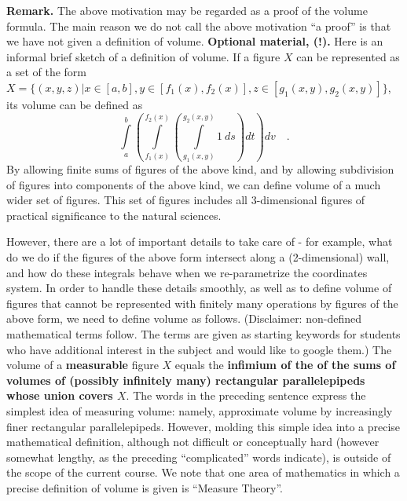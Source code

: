 \documentclass[12pt]{book}
\renewcommand{\emph}{\textbf}
\begin{document}
\begin{itemize}
\textbf{Remark.} The above motivation may be regarded as a proof of the volume formula. The main reason we do not call the above motivation ``a proof'' is that we have not given a definition of volume. \textbf{Optional material, (!).} Here is an informal brief sketch  of a definition of volume. If a figure $X$ can be represented as a set of the form $X= \{(x,y,z)| x\in [a,b], y\in [f_1(x), f_2(x)], z\in [g_1(x,y),  g_2(x,y)]\}$, its volume can be defined as 
\[
\int\limits_a^b \left(\int\limits_{f_1(x)}^{f_2(x)}\left(\int\limits_{g_1(x,y)}^{g_2(x,y)} 1 ~ ds \right)dt \right)dv \quad .
\]
By allowing finite sums of figures of the above kind, and by allowing subdivision of figures into components of the above kind, we can define volume of a much wider set of figures. This set of figures includes all 3-dimensional figures of practical significance to  the natural sciences. 

However, there are a lot of important details to take care of - for example, what do we do if the figures of the above form intersect along a (2-dimensional) wall, and how do these integrals behave when we re-parametrize the coordinates system. In order to handle these details smoothly, as well as to define volume of figures that cannot be represented with finitely many operations by  figures of the above form,  we need to define volume as follows. (Disclaimer: non-defined mathematical terms follow. The terms are given as starting keywords for students who have additional interest in the subject and would like to google them.) The volume of a \emph{measurable} figure $X$ equals the \emph{infimium of the of the sums of volumes of (possibly infinitely many) rectangular parallelepipeds whose union covers $X$}. The words in the preceding sentence express the simplest idea of measuring volume: namely, approximate volume by increasingly finer rectangular parallelepipeds. However, molding this simple idea into a precise mathematical definition, although not difficult or conceptually hard (however somewhat lengthy, as the preceding ``complicated'' words indicate), is outside of the scope of the current course. We note that one area of mathematics in which a precise definition of volume is given is ``Measure Theory''.
\end{itemize}
\end{document}
